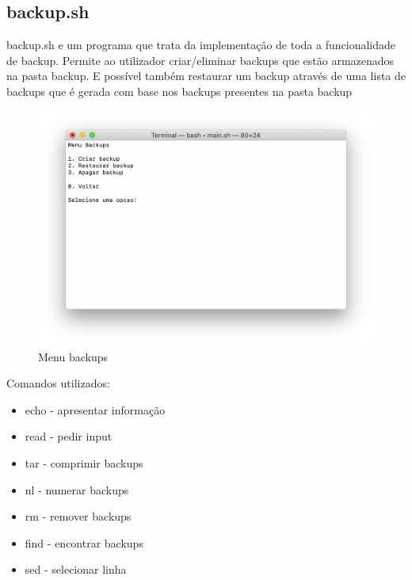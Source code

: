 \documentclass{article}
\begin{document}
\pagebreak{}
\subsection{backup.sh}
\label{sec:org6ed11a5}

backup.sh e um programa que trata da implementação de toda a funcionalidade de backup.
Permite ao utilizador criar/eliminar backups que estão armazenados na pasta backup.
E possível também restaurar um backup através de uma lista de backups que é gerada com base nos backups presentes na pasta backup

\begin{figure}[h]
\centering
\includegraphics[scale=0.4]{images/MenuBackups}
\caption{Menu backups}
\end{figure}

Comandos utilizados:

\begin{itemize}
\item echo - apresentar informação
\item read - pedir input
\item tar - comprimir backups
\item nl - numerar backups
\item rm - remover backups
\item find - encontrar backups
\item sed - selecionar linha
\end{itemize}
\end{document}
